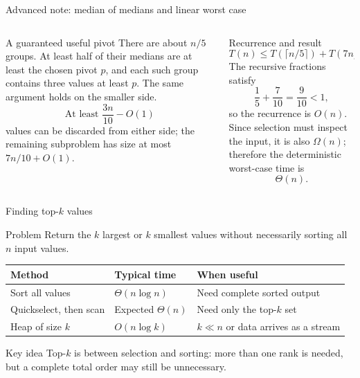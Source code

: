 \documentclass[aspectratio=169]{beamer}
\begin{document}
\begin{frame}{Advanced note: median of medians and linear worst case}
  \footnotesize
  \begin{columns}[T]
    \begin{column}{0.48\textwidth}
      \begin{block}{A guaranteed useful pivot}
        There are about $n/5$ groups. At least half of their medians are at
        least the chosen pivot $p$, and each such group contains three values
        at least $p$. The same argument holds on the smaller side.
        \[
          \text{At least }\frac{3n}{10}-O(1)
        \]
        values can be discarded from either side; the remaining subproblem has
        size at most $7n/10+O(1)$.
      \end{block}
    \end{column}
    \begin{column}{0.48\textwidth}
      \begin{alertblock}{Recurrence and result}
        \[
          T(n)\le T(\lceil n/5\rceil)
          +T(7n/10+O(1))+cn.
        \]
        The recursive fractions satisfy
        \[
          \frac15+\frac7{10}=\frac9{10}<1,
        \]
        so the recurrence is $O(n)$. Since selection must inspect the input,
        it is also $\Omega(n)$; therefore the deterministic worst-case time is
        \[
          \Theta(n).
        \]
      \end{alertblock}
    \end{column}
  \end{columns}
\end{frame}

\begin{frame}{Finding top-$k$ values}
  \small
  \begin{block}{Problem}
    Return the $k$ largest or $k$ smallest values without necessarily sorting
    all $n$ input values.
  \end{block}
  \begin{center}
    \begin{tabular}{L{0.25\textwidth}L{0.22\textwidth}L{0.34\textwidth}}
      \toprule
      \textbf{Method} & \textbf{Typical time} & \textbf{When useful} \\
      \midrule
      Sort all values & $\Theta(n\log n)$ & Need complete sorted output \\
      Quickselect, then scan & Expected $\Theta(n)$ & Need only the top-$k$ set \\
      Heap of size $k$ & $O(n\log k)$ & $k\ll n$ or data arrives as a stream \\
      \bottomrule
    \end{tabular}
  \end{center}
  \begin{alertblock}{Key idea}
    Top-$k$ is between selection and sorting: more than one rank is needed, but
    a complete total order may still be unnecessary.
  \end{alertblock}
\end{frame}
\end{document}
